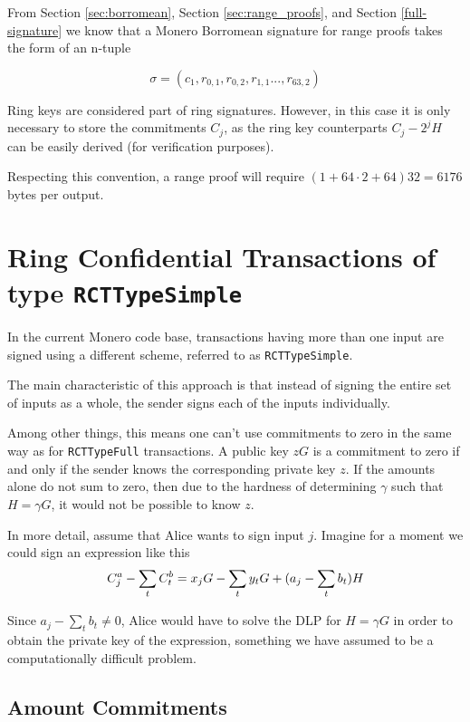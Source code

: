 From Section \ref{sec:borromean}, Section \ref{sec:range_proofs}, and Section \ref{full-signature} we know that a Monero Borromean signature for range proofs takes the form of an n-tuple

\[\sigma = (c_1, r_{0, 1}, r_{0, 2}, r_{1, 1}..., r_{63, 2} )  \]

Ring keys are considered part of ring signatures. However, in this case it is only necessary to store the commitments $C_j$, as the ring key counterparts $C_j - 2^j H$ can be easily derived (for verification purposes).

Respecting this convention, a range proof will require \( ( 1 + 64 \cdot 2 + 64  ) 32 = 6176\) bytes per output.
\\


\section{ Ring Confidential Transactions of type {\tt RCTTypeSimple}}
\label{sec:RCTTypeSimple}

In the current Monero code base, transactions having more than one input are signed using a different scheme, referred to as {\tt RCTTypeSimple}.

The main characteristic of this approach is that instead of signing the entire set of inputs as a whole, the sender signs each of the inputs individually.

Among other things, this means one can’t use commitments to zero in the same way as for {\tt RCTTypeFull} transactions. A public key $z G$ is a commitment to zero if and only if the sender knows the corresponding private key $z$. If the amounts alone do not sum to zero, then due to the hardness of determining $\gamma$ such that $H = \gamma G$, it would not be possible to know $z$.

In more detail, assume that Alice wants to sign input $j$. Imagine for a moment we could sign an expression like this\\
\[  C^a_{j} - \sum\limits_t C^b_{t} \\
= x_j G -  \sum_t y_t G + (a_j - \sum\limits_t  b_t) H \]

Since \(a_j - \sum\limits_t  b_t \ne 0\), Alice would have to solve the DLP for \(H = \gamma G\) in order to obtain the private key of the expression, something we have assumed to be a computationally difficult problem.


\subsection{Amount Commitments}
\label{RCTTypeSimple-commitments}

